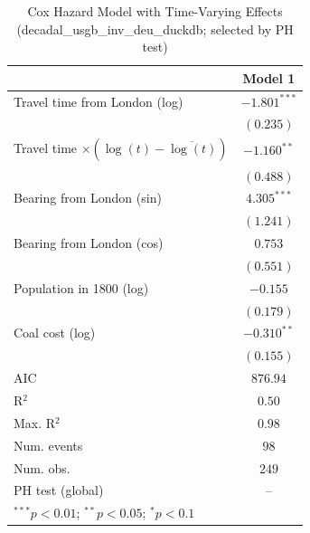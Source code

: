 
\begin{table}
\begin{center}
\begin{tabular}{l c}
\hline
 & Model 1 \\
\hline
Travel time from London (log) & $-1.801^{***}$ \\
 & $(0.235)$ \\
Travel time $\times (\log(t)-\overline{\log(t)})$ & $-1.160^{**}$ \\
 & $(0.488)$ \\
Bearing from London (sin) & $4.305^{***}$ \\
 & $(1.241)$ \\
Bearing from London (cos) & $0.753$ \\
 & $(0.551)$ \\
Population in 1800 (log) & $-0.155$ \\
 & $(0.179)$ \\
Coal cost (log) & $-0.310^{**}$ \\
 & $(0.155)$ \\
\hline
AIC              & $876.94$ \\
R$^2$            & $0.50$ \\
Max. R$^2$       & $0.98$ \\
Num. events      & $98$ \\
Num. obs.        & $249$ \\
PH test (global) & -- \\
\hline
\multicolumn{2}{l}{\scriptsize{$^{***}p<0.01$; $^{**}p<0.05$; $^{*}p<0.1$}}
\end{tabular}
\caption{Cox Hazard Model with Time-Varying Effects (decadal\_usgb\_inv\_deu\_duckdb; selected by PH test)}
\label{tab:cox_serious_tv_decadal_usgb_inv_deu_duckdb}
\end{center}
\end{table}
